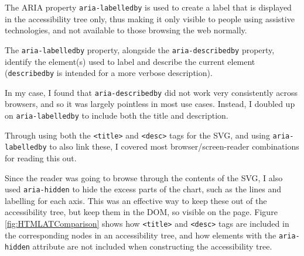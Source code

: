 \documentclass[ %
                    author={Aleena Baig},
                supervisor={Dr Simon Lock},
                    degree={BSc},
                     title={On Making Web Accessible Graphs},
                  subtitle={},
                      year={2019} ]{dissertation}
\begin{document}
The ARIA property \texttt{aria-labelledby} is used to create a label that is displayed in the accessibility tree only, thus making it only visible to people using assistive technologies, and not available to those browsing the web normally.

The \texttt{aria-labelledby} property, alongside the \texttt{aria-describedby} property, identify the element(s) used to label and describe the current element (\texttt{describedby} is intended for a more verbose description).

In my case, I found that \texttt{aria-describedby} did not work very consistently across browsers, and so it was largely pointless in most use cases. Instead, I doubled up on \texttt{aria-labelledby} to include both the title and description.

Through using both the \texttt{<title>} and \texttt{<desc>} tags for the SVG, and using \texttt{aria-labelledby} to also link these, I covered most browser/screen-reader combinations for reading this out.

Since the reader was going to browse through the contents of the SVG, I also used \texttt{aria-hidden} to hide the excess parts of the chart, such as the lines and labelling for each axis. This was an effective way to keep these out of the accessibility tree, but keep them in the DOM, so visible on the page. Figure \ref{fig:HTMLATComparison} shows how \texttt{<title>} and \texttt{<desc>} tags are included in the corresponding nodes in an accessibility tree, and how elements with the \texttt{aria-hidden} attribute are not included when constructing the accessibility tree.
\end{document}
